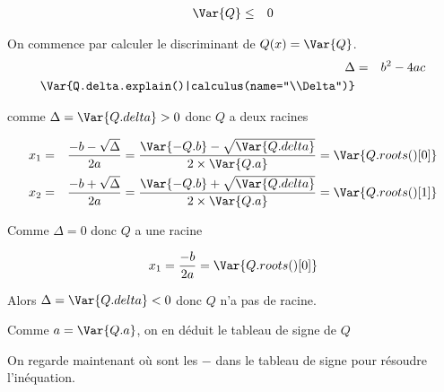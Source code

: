 \documentclass[a4paper,10pt, table]{/media/documents/Cours/Prof/Enseignements/tools/style/classDS}
\begin{document}
\begin{questions}
        \begin{eqnarray*}
            \Var{Q} & \leq &0  \\
        \end{eqnarray*}
    \begin{solution}
        On commence par calculer le discriminant de $Q(x) = \Var{Q}$.
        \begin{eqnarray*}
            \Delta & = & b^2-4ac \\
            \Var{Q.delta.explain()|calculus(name="\\Delta")}
        \end{eqnarray*}

            comme $\Delta = \Var{Q.delta} > 0$ donc $Q$ a deux racines

            \begin{eqnarray*}
                x_1 & = & \frac{-b - \sqrt{\Delta}}{2a} =  \frac{\Var{-Q.b} - \sqrt{\Var{Q.delta}}}{2 \times \Var{Q.a}} = \Var{Q.roots()[0] } \\
                x_2 & = & \frac{-b + \sqrt{\Delta}}{2a} =  \frac{\Var{-Q.b} + \sqrt{\Var{Q.delta}}}{2 \times \Var{Q.a}} = \Var{Q.roots()[1] }
            \end{eqnarray*}


            Comme $\Delta = 0$ donc $Q$ a une racine

            \begin{eqnarray*}
                x_1 = \frac{-b}{2a} = \Var{Q.roots()[0]} \\
            \end{eqnarray*}

            Alors $\Delta = \Var{Q.delta} < 0$ donc $Q$ n'a pas de racine.

        Comme $a = \Var{Q.a}$, on en déduit le tableau de signe de $Q$
            \begin{center}
            \end{center}
        On regarde maintenant où sont les $-$ dans le tableau de signe pour résoudre l'inéquation.
        \end{solution}


\end{questions}
\end{document}
